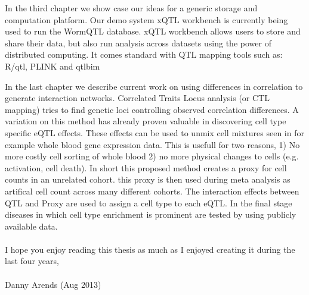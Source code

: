 In the third chapter we show case our ideas for a generic storage and computation platform. Our demo 
system xQTL workbench is currently being used to run the WormQTL database. xQTL workbench allows 
users to store and share their data, but also run analysis across datasets using the power of 
distributed computing. It comes standard with  QTL mapping tools such as: R/qtl, PLINK and qtlbim

In the last chapter we describe current work on using differences in correlation to generate 
interaction networks. Correlated Traits Locus analysis (or CTL mapping) tries to find genetic 
loci controlling observed correlation differences. A variation on this method has already proven 
valuable in discovering cell type specific eQTL effects. These effects can be used to unmix cell 
mixtures seen in for example whole blood gene expression data. This is usefull for two reasons, 
1) No more costly cell sorting of whole blood 2) no more physical changes to cells (e.g. activation, 
cell death). In short this proposed method creates a proxy for cell counts in an unrelated cohort. 
this proxy is then used during meta analysis as artifical cell count across many different cohorts.
The interaction effects between QTL and Proxy are used to assign a cell type to each eQTL. In the final 
stage diseases in which cell type enrichment is prominent are tested by using publicly available data.\\\\

I hope you enjoy reading this thesis as much as I enjoyed creating it during the last four years,\\\\

Danny Arends (Aug 2013)

